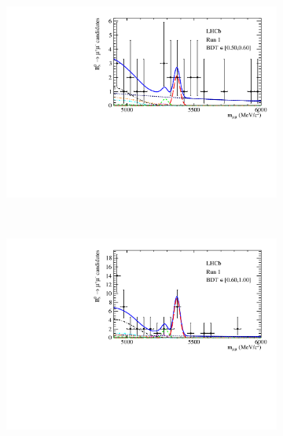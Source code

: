 \begin{figure}[htbp]
\begin{subfigure}[b]{0.48\textwidth}
        \includegraphics[width=\textwidth]{./Figs/BFAnalysis/Bsmumu_Fit_Run1_bin4.pdf}
    \end{subfigure}
    ~ %
    \begin{subfigure}[b]{0.48\textwidth}
       \includegraphics[width=\textwidth]{./Figs/BFAnalysis/Bsmumu_Fit_Run1_bin5.pdf}
    \end{subfigure}

    \qquad


\end{figure}
